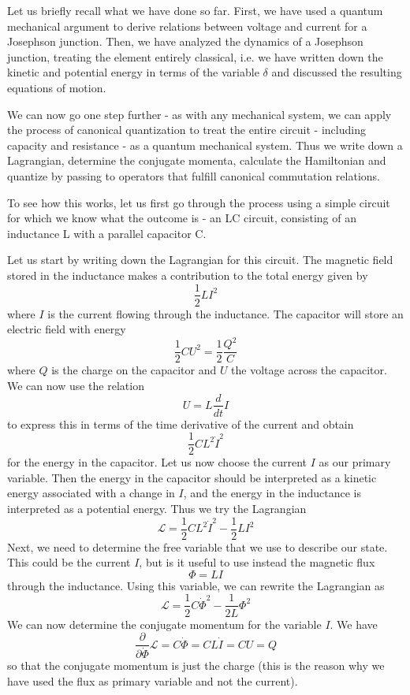 \documentclass[a4paper, draft]{article}
\theoremstyle{own}
\theoremstyle{remark}
\begin{document}
Let us briefly recall what we have done so far. First, we have used a quantum mechanical argument to derive relations between voltage and current for a Josephson junction. Then, we have analyzed the dynamics of a Josephson junction, treating the element entirely classical, i.e. we have written down the kinetic and potential energy in terms of the variable $\delta$ and discussed the resulting equations of motion.

We can now go one step further - as with any mechanical system, we can apply the process of canonical quantization to treat the entire circuit - including capacity and resistance - as a quantum mechanical system. Thus we write down a Lagrangian, determine the conjugate momenta, calculate the Hamiltonian and quantize by passing to operators that fulfill canonical commutation relations.

To see how this works, let us first go through the process using a simple circuit for which we know what the outcome is - an LC circuit, consisting of an inductance L with a parallel capacitor C.

Let us start by writing down the Lagrangian for this circuit. The magnetic field stored in the inductance makes a contribution to the total energy given by
$$
\frac{1}{2} L I^2
$$
where $I$ is the current flowing through the inductance. The capacitor will store an electric field with energy
$$
\frac{1}{2} C U^2 = \frac{1}{2} \frac{Q^2}{C}
$$
where $Q$ is the charge on the capacitor and $U$ the voltage across the capacitor.  We can now use the relation 
$$
U = L \frac{d}{dt} I
$$
to express this in terms of the time derivative of the current and obtain
$$
\frac{1}{2} C L^2 \dot{I}^2
$$
for the energy in the capacitor. Let us now choose the current $I$ as our primary variable. Then the energy in the capacitor should be interpreted as a kinetic energy associated with a change in $I$, and the energy in the inductance is interpreted as a potential energy. Thus we try the Lagrangian
$$
{\mathcal L} = \frac{1}{2}CL^2 \dot{I}^2 - \frac{1}{2} LI^2
$$
Next, we need to determine the free variable that we use to describe our state. This could be the current $I$, but is it useful to use instead the magnetic flux
$$
\Phi = L I
$$
through the inductance. Using this variable, we can rewrite the Lagrangian as
$$
{\mathcal L} = \frac{1}{2} C \dot{\Phi}^2 - \frac{1}{2L} \Phi^2
$$
We can now determine the conjugate momentum for the variable $I$. We have
$$
\frac{\partial}{\partial \dot{\Phi}} {\mathcal L} = C \dot{\Phi} = CL \dot{I} = CU = Q
$$
so that the conjugate momentum is just the charge (this is the reason why we have used the flux as primary variable and not the current). 
\end{document}
